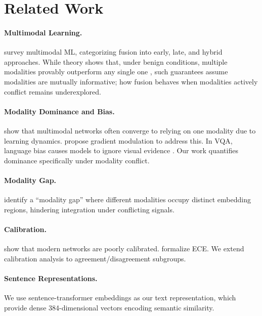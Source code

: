\documentclass[11pt,a4paper]{article}
\begin{document}
\section{Related Work}

\paragraph{Multimodal Learning.}
\citet{baltrusaitis2019multimodal} survey multimodal ML, categorizing fusion into early, late, and hybrid approaches.
While theory shows that, under benign conditions, multiple modalities provably outperform any single one \citep{huang2021makes}, such guarantees assume modalities are mutually informative; how fusion behaves when modalities actively conflict remains underexplored.

\paragraph{Modality Dominance and Bias.}
\citet{wang2020makes} show that multimodal networks often converge to relying on one modality due to learning dynamics.
\citet{peng2022balanced} propose gradient modulation to address this.
In VQA, language bias causes models to ignore visual evidence \citep{goyal2017making}.
Our work quantifies dominance specifically under modality conflict.

\paragraph{Modality Gap.}
\citet{liang2022mind} identify a ``modality gap'' where different modalities occupy distinct embedding regions, hindering integration under conflicting signals.

\paragraph{Calibration.}
\citet{guo2017calibration} show that modern networks are poorly calibrated.
\citet{nixon2019measuring} formalize ECE.
We extend calibration analysis to agreement/disagreement subgroups.

\paragraph{Sentence Representations.}
We use sentence-transformer embeddings \citep{reimers2019sentence} as our text representation, which provide dense 384-dimensional vectors encoding semantic similarity.
\end{document}
